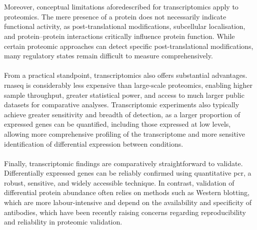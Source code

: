 \\
\\
Moreover, conceptual limitations aforedescribed for transcriptomics apply to proteomics. The mere presence of a protein does not necessarily indicate functional activity, as post-translational modifications, subcellular localisation, and protein–protein interactions critically influence protein function\cite{begum_western_2022}. While certain proteomic approaches can detect specific post-translational modifications, many regulatory states remain difficult to measure comprehensively\cite{begum_western_2022}.
\\
\\
From a practical standpoint, transcriptomics also offers substantial advantages. \gls{rnaseq} is considerably less expensive than large-scale proteomics, enabling higher sample throughput, greater statistical power, and access to much larger public datasets for comparative analyses\cite{edfors_gene-specific_2016, koussounadis_relationship_2015}. Transcriptomic experiments also typically achieve greater sensitivity and breadth of detection, as a larger proportion of expressed genes can be quantified, including those expressed at low levels, allowing more comprehensive profiling of the transcriptome and more sensitive identification of differential expression between conditions\cite{edfors_gene-specific_2016, koussounadis_relationship_2015}.
\\
\\
Finally, transcriptomic findings are comparatively straightforward to validate. Differentially expressed genes can be reliably confirmed using quantitative \gls{pcr}\cite{bong_brief_2024}, a robust, sensitive, and widely accessible technique. In contrast, validation of differential protein abundance often relies on methods such as Western blotting\cite{edfors_gene-specific_2016}, which are more labour-intensive and depend on the availability and specificity of antibodies, which have been recently raising concerns regarding reproducibility and reliability in proteomic validation\cite{biddle_improving_2024, goodman_antibody_2018, baker_reproducibility_2015}.


